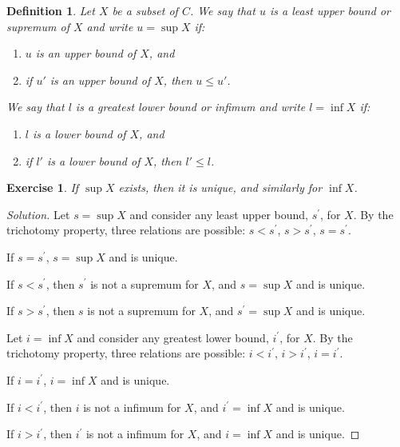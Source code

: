\documentclass{amsart}
\newtheorem{definition}[theorem]{Definition}
\newtheorem{exercise}[theorem]{Exercise}
\newcommand{\1}{\mathds{1}}
\numberwithin{equation}{section}
\numberwithin{theorem}{section}
\begin{document}
\begin{definition}  Let $X$ be a subset of $C$.  We say that $u$ is a \emph{least upper bound} or {\em supremum} of $X$ and write $u = \sup X$ if:
\begin{enumerate}
\item  $u$ is an upper bound of $X$, and
\item  if $u'$ is an upper bound of $X$, then $u \leq u'$.
\end{enumerate}
We say that $l$ is a \emph{greatest lower bound} or {\em infimum} and write $l = \inf X$ if:
\begin{enumerate}
\item $l$ is a lower bound of $X$, and
\item if $l'$ is a lower bound of $X$, then $l' \leq l$.
\end{enumerate}
\end{definition}


\begin{exercise}  If $\sup X$ exists, then it is unique, and similarly for $\inf X$.
\end{exercise}

\begin{proof}[Solution]
	Let $s = \sup X$ and consider any least upper bound, $s^\prime$, for $X$. By the trichotomy property, three relations are possible: $s<s^\prime$, $s>s^\prime$, $s=s^\prime$.
	
	If $s=s^\prime$, $s = \sup X$ and is unique.
	
	If $s<s^\prime$, then $s^\prime$ is not a supremum for $X$, and $s = \sup X$ and is unique. 

	If $s>s^\prime$, then $s$ is not a supremum for $X$, and $s^\prime = \sup X$ and is unique.
	
	Let $i = \inf X$ and consider any greatest lower bound, $i^\prime$, for $X$. By the trichotomy property, three relations are possible: $i<i^\prime$, $i>i^\prime$, $i=i^\prime$.
	
	If $i=i^\prime$, $i = \inf X$ and is unique.
	
	If $i<i^\prime$, then $i$ is not a infimum for $X$, and $i^\prime = \inf X$ and is unique. 
	
	If $i>i^\prime$, then $i^\prime$ is not a infimum for $X$, and $i = \inf X$ and is unique.
\end{proof}
\end{document}
